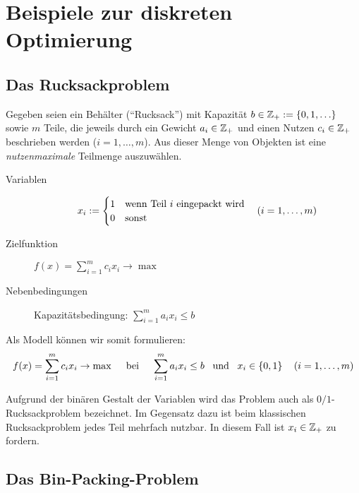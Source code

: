 \section{Beispiele zur diskreten Optimierung}
\label{sec: 1.3}

\subsection{Das Rucksackproblem}
\label{subsec: 1.3.1}

Gegeben seien ein Behälter (\enquote{Rucksack}) mit Kapazität $b \in \Z_+ \defeq \menge{0, 1, \dots}$ sowie $m$ Teile, die jeweils durch ein Gewicht $a_i \in \mathbb{Z}_+$ und einen Nutzen $c_i \in \mathbb{Z}_+$ beschrieben werden ($i = 1, \dots , m$). Aus dieser Menge von Objekten ist eine \textit{nutzenmaximale} Teilmenge auszuwählen.

\begin{description}
	\item[Variablen] \begin{equation*}
		x_i \mathrel{:=} \begin{cases}
		1 & \text{wenn Teil $i$ eingepackt wird} \\ 0 & \text{sonst}
		\end{cases} \quad (i = 1, \dots , m)
	\end{equation*}
	\item[Zielfunktion] $f(x) = \sum\limits_{i=1}^{m} c_i x_i \to \max$
	\item[Nebenbedingungen] Kapazitätsbedingung: $\sum\limits_{i=1}^{m} a_i x_i \le b$
\end{description}

Als Modell können wir somit formulieren:
\begin{equation*}
	\begin{aligned}
	f(x) = \sum_{i=1}^{m} c_i x_i \to \max \quad \text{ bei } \quad \sum_{i=1}^m a_i x_i \le b \enskip \text{ und } \enskip x_i \in \left\{ 0,1 \right\} \quad (i = 1, \dots , m)
	\end{aligned}
\end{equation*}

Aufgrund der binären Gestalt der Variablen wird das Problem auch als $0/1$-Rucksackproblem bezeichnet. Im Gegensatz dazu ist beim klassischen Rucksackproblem jedes Teil mehrfach nutzbar. In diesem Fall ist $x_i \in \mathbb{Z}_+$ zu fordern.

\subsection{Das Bin-Packing-Problem}
\label{subsec: 1.3.2}

